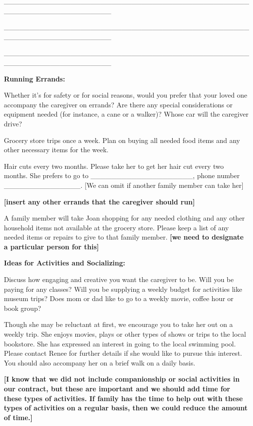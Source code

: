 \documentclass[]{article}
\begin{document}
\_\_\_\_\_\_\_\_\_\_\_\_\_\_\_\_\_\_\_\_\_\_\_\_\_\_\_\_\_\_\_\_\_\_\_\_\_\_\_\_\_\_\_\_\_\_\_\_\_\_\_\_\_\_\_\_\_\_\_\_\_\_\_\_\_\_\_\_\_

\_\_\_\_\_\_\_\_\_\_\_\_\_\_\_\_\_\_\_\_\_\_\_\_\_\_\_\_\_\_\_\_\_\_\_\_\_\_\_\_\_\_\_\_\_\_\_\_\_\_\_\_\_\_\_\_\_\_\_\_\_\_\_\_\_\_\_\_\_

\_\_\_\_\_\_\_\_\_\_\_\_\_\_\_\_\_\_\_\_\_\_\_\_\_\_\_\_\_\_\_\_\_\_\_\_\_\_\_\_\_\_\_\_\_\_\_\_\_\_\_\_\_\_\_\_\_\_\_\_\_\_\_\_\_\_\_\_\_

\textbf{Running Errands:}

Whether it's for safety or for social reasons, would you prefer that
your loved one accompany the caregiver on errands? Are there any special
considerations or equipment needed (for instance, a cane or a walker)?
Whose car will the caregiver drive?

Grocery store trips once a week. Plan on buying all needed food items
and any other necessary items for the week.

Hair cuts every two months. Please take her to get her hair cut every
two months. She prefers to go to
\_\_\_\_\_\_\_\_\_\_\_\_\_\_\_\_\_\_\_\_, phone number
\_\_\_\_\_\_\_\_\_\_\_\_\_\_\_. {[}We can omit if another family member
can take her{]}

\textbf{{[}insert any other errands that the caregiver should run{]}}

A family member will take Joan shopping for any needed clothing and any
other household items not available at the grocery store. Please keep a
list of any needed items or repairs to give to that family member.
\textbf{{[}we need to designate a particular person for this{]}}

\textbf{Ideas for Activities and Socializing:}

Discuss how engaging and creative you want the caregiver to be. Will you
be paying for any classes? Will you be supplying a weekly budget for
activities like museum trips? Does mom or dad like to go to a weekly
movie, coffee hour or book group?

Though she may be reluctant at first, we encourage you to take her out
on a weekly trip. She enjoys movies, plays or other types of shows or
trips to the local bookstore. She has expressed an interest in going to
the local swimming pool. Please contact Renee for further details if she
would like to pursue this interest. You should also accompany her on a
brief walk on a daily basis.

\textbf{{[}I know that we did not include companionship or social
activities in our contract, but these are important and we should add
time for these types of activities. If family has the time to help out
with these types of activities on a regular basis, then we could reduce
the amount of time.{]}}
\end{document}

